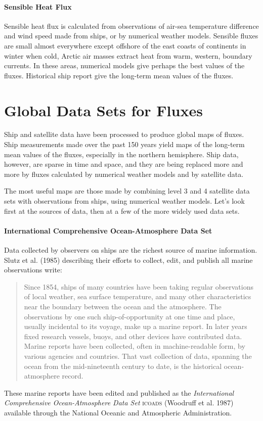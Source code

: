 \paragraph{Sensible Heat Flux}
Sensible heat flux is calculated from observations of air-sea
temperature difference and wind speed made from ships, or by numerical weather models. Sensible fluxes are
small almost everywhere except offshore of the east coasts of continents in winter when cold, Arctic air
masses extract heat from warm, western, boundary currents. In these areas, numerical
models give perhaps the best values of the fluxes. Historical ship report give the
long-term mean values of the fluxes.

\section{Global Data Sets for Fluxes}
Ship and satellite data have been processed to
produce global maps of  fluxes. Ship measurements made over the
past 150 years yield maps of the long-term mean values of the fluxes, especially in
the northern hemisphere. Ship data, however, are sparse in time and space, and
they are being replaced more and more by fluxes calculated by numerical weather models and by
satellite data.

The most useful maps are those made by combining level 3 and 4
satellite data sets with  observations from ships, using numerical weather
models. Let's look first at the sources of data, then at a few of the more widely
used data sets.

\paragraph{International Comprehensive Ocean-Atmosphere Data Set}
Data collected by
observers on ships are the richest source of marine information. Slutz et al.
(1985) describing their efforts to collect, edit, and publish all marine
observations write:
\begin{quotation} \small
Since 1854, ships of many countries have been taking regular observations
of local weather, sea surface temperature, and many other characteristics
near the boundary between the ocean and the atmosphere. The observations
by one such ship-of-opportunity at one time and place, usually incidental
to its voyage, make up a marine report. In later years fixed research
vessels, buoys, and other devices have contributed data. Marine reports
have been collected, often in machine-readable form, by various agencies and
countries. That vast collection of data, spanning the ocean from
the mid-nineteenth century to date, is the historical ocean-atmosphere record.
\end{quotation}
These marine reports have been edited and published as the
\textit{International Comprehensive Ocean-Atmos\-phere Data Set} \textsc{icoads} (Woodruff et al.
1987) available through the National Oceanic and Atmospheric Administration.

